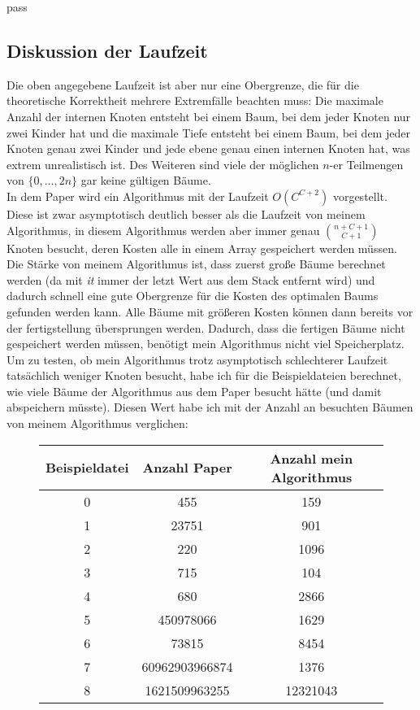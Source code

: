 pass\documentclass[a4paper,10pt,ngerman]{scrartcl}
\begin{document}
    \subsection{Diskussion der Laufzeit}
    Die oben angegebene Laufzeit ist aber nur eine Obergrenze, die für die theoretische Korrektheit mehrere Extremfälle beachten muss:
    Die maximale Anzahl der internen Knoten entsteht bei einem Baum, bei dem jeder Knoten nur zwei Kinder hat und die maximale Tiefe entsteht bei einem Baum, bei dem jeder Knoten genau zwei Kinder und jede ebene genau einen internen Knoten hat, was extrem unrealistisch ist.
    Des Weiteren sind viele der möglichen $n$-er Teilmengen von $\{0, \dots, 2n\}$ gar keine gültigen Bäume. \\
    In dem Paper\autocite{golin_dynamic_1998} wird ein Algorithmus mit der Laufzeit $O(C^{C+2})$ vorgestellt.
    Diese ist zwar asymptotisch deutlich besser als die Laufzeit von meinem Algorithmus, in diesem Algorithmus werden aber
    immer genau ${n + C + 1}\choose {C+ 1}$ Knoten besucht, deren Kosten alle in einem Array gespeichert werden müssen.
    Die Stärke von meinem Algorithmus ist, dass zuerst große Bäume berechnet werden (da mit \textit{it} immer der letzt Wert aus dem Stack entfernt wird) und dadurch schnell eine gute Obergrenze für die Kosten des optimalen Baums gefunden werden kann.
    Alle Bäume mit größeren Kosten können dann bereits vor der fertigstellung übersprungen werden.
    Dadurch, dass die fertigen Bäume nicht gespeichert werden müssen, benötigt mein Algorithmus nicht viel Speicherplatz.
    Um zu testen, ob mein Algorithmus trotz asymptotisch schlechterer Laufzeit tatsächlich weniger Knoten besucht, habe
    ich für die Beispieldateien berechnet, wie viele Bäume der Algorithmus aus dem Paper besucht hätte (und damit abspeichern müsste).
    Diesen Wert habe ich mit der Anzahl an besuchten Bäumen von meinem Algorithmus verglichen:
    \begin{figure}[H]
        \centering
        \begin{tabular}{c |c | c}
            Beispieldatei & Anzahl Paper   & Anzahl mein Algorithmus \\
            \hline
            0             & 455            & 159                     \\
            1             & 23751          & 901                     \\
            2             & 220            & 1096                    \\
            3             & 715            & 104                     \\
            4             & 680            & 2866                    \\
            5             & 450978066      & 1629                    \\
            6             & 73815          & 8454                    \\
            7             & 60962903966874 & 1376                    \\
            8             & 1621509963255  & 12321043                \\
        \end{tabular}
    \end{figure}
\end{document}
